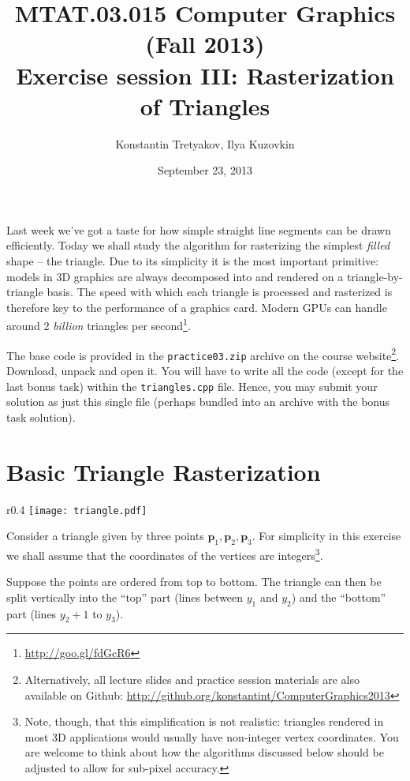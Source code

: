 \documentclass{article}
\newcommand{\bp}{\mathbf{p}}
\begin{document}
\title{MTAT.03.015 Computer Graphics (Fall 2013)\\
Exercise session III: Rasterization of Triangles}
\author{Konstantin Tretyakov, Ilya Kuzovkin}
\date{September 23, 2013}
\maketitle

Last week we've got a taste for how simple straight line segments can be drawn efficiently. Today we shall study the algorithm for rasterizing the simplest \emph{filled} shape -- the triangle. Due to its simplicity it is the most important primitive: models in 3D graphics are always decomposed into and rendered on a triangle-by-triangle basis. The speed with which each triangle is processed and rasterized is therefore key to the performance of a graphics card. Modern GPUs can handle around 2 \emph{billion} triangles per second\footnote{\url{http://goo.gl/fdGcR6}}.

The base code is provided in the \texttt{practice03.zip} archive on the course website\footnote{Alternatively, all lecture slides and practice session materials are also available on Github: \url{http://github.org/konstantint/ComputerGraphics2013}}. Download, unpack and open it. You will have to write all the code (except for the last bonus task) within the \texttt{triangles.cpp} file. Hence, you may submit your solution as just this single file (perhaps bundled into an archive with the bonus task solution).

\section{Basic Triangle Rasterization}


\begin{wrapfigure}{r}{0.4\textwidth}
\centering
\texttt{[image: triangle.pdf]}
\end{wrapfigure}

Consider a triangle given by three points $\bp_1, \bp_2, \bp_3$. For simplicity in this exercise we shall assume that the coordinates of the vertices are integers\footnote{Note, though, that this simplification is not realistic: triangles rendered in most 3D applications would usually have non-integer vertex coordinates. You are welcome to think about how the algorithms discussed below should be adjusted to allow for sub-pixel accuracy.}.

Suppose the points are ordered from top to bottom. The triangle can then be split vertically into the ``top'' part (lines between $y_1$ and $y_2$) and the ``bottom'' part (lines $y_2+1$ to $y_3$).
\end{document}
